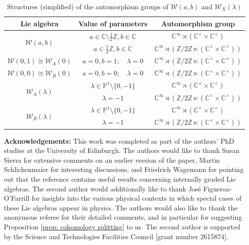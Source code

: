 \documentclass[11pt, svgnames]{amsart}
\newcommand{\ZZ}{\mathbb{Z}}
\newcommand{\CC}{\mathbb{C}}
\newcommand{\PP}{\mathbb{P}}
\newcommand{\W}{\mathcal{W}}
\theoremstyle{definition}
\begin{document}
\begin{table}[ht]
\centering
\begin{tabular}{|c|c|c|}
\hline
\textbf{Lie algebra}             & \textbf{Value of parameters}                    & \textbf{Automorphism group}                                            \\ \hline
\multirow{2}{*}{$\W(a,b)$}       & $a \in \CC \setminus \frac{1}{2}\ZZ, b \in \CC$ & $\CC^\infty \rtimes (\CC^\times \times \CC^\times)$                    \\ \cline{2-3} 
                                 & $a \in \frac{1}{2}\ZZ, b \in \CC$               & $\CC^\infty \rtimes (\ZZ/2\ZZ \ltimes (\CC^\times \times \CC^\times))$ \\ \hline
$\W(0,1) \cong \W_A(0)$          & $a = 0, b = 1; \quad \lambda = 0$               & $\CC^\infty \rtimes (\ZZ/2\ZZ \ltimes (\CC^\times \times \CC^\times))$ \\ \hline
$\W(0,0) \cong \W_B(0)$          & $a = 0, b = 0; \quad \lambda = 0$               & $\CC^\infty \rtimes (\ZZ/2\ZZ \ltimes (\CC^\times \times \CC^\times))$ \\ \hline
\multirow{2}{*}{$\W_A(\lambda)$} & $\lambda \in \PP^1 \setminus \{0,-1\}$          & $\CC^\infty \rtimes (\CC^\times \times \CC^\times)$                    \\ \cline{2-3} 
                                 & $\lambda = -1$                                  & $\CC^\infty \rtimes (\ZZ/2\ZZ \ltimes (\CC^\times \times \CC^\times))$ \\ \hline
\multirow{2}{*}{$\W_B(\lambda)$} & $\lambda \in \PP^1 \setminus \{0,-1\}$          & $\CC^\infty \rtimes (\CC^\times \times \CC^\times)$                    \\ \cline{2-3} 
                                 & $\lambda = -1$                                  & $\CC^\infty \rtimes (\ZZ/2\ZZ \ltimes (\CC^\times \times \CC^\times))$ \\ \hline
\end{tabular}
\caption{Structures (simplified) of the automorphism groups of $\W(a,b)$ and $\W_X(\lambda)$}
\end{table}

\newpage

\noindent \textbf{Acknowledgements:} This work was completed as part of the authors' PhD studies at the University of Edinburgh. The authors would like to thank Susan Sierra for extensive comments on an earlier version of the paper, Martin Schlichenmaier for interesting discussions, and Friedrich Wagemann for pointing out that the reference \cite{Fuchs} contains useful results concerning internally graded Lie algebras. The second author would additionally like to thank Jos\'{e} Figueroa-O'Farrill for insights into the various physical contexts in which special cases of these Lie algebras appear in physics. The authors would also like to thank the anonymous referee for their detailed comments, and in particular for suggesting Proposition \ref{prop: cohomology splitting} to us. The second author is supported by the Science and Technologies Facilities Council [grant number 2615874].
\end{document}
